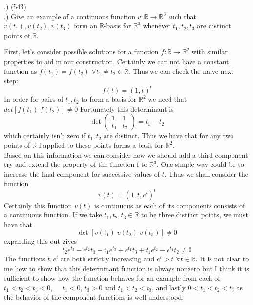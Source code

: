 \documentclass[a4paper, 11pt]{article}
\newcommand{\R}{\mathbb{R}}
\newenvironment{solution}{%
	\begin{list}{}{%
			\setlength{\topsep}{0pt}%
			\setlength{\leftmargin}{1.5cm}%
			\setlength{\rightmargin}{1.5cm}%
			\setlength{\listparindent}{\parindent}%
			\setlength{\itemindent}{\parindent}%
			\setlength{\parsep}{\parskip}%
		}%
		\item[]}{\end{list}}
\begin{document}
.) (543)\\

.) Give an example of a continuous function $v:\R\to\R^3$ such that $v(t_1), v(t_2), v(t_3)$ form an $\R$-basis for $\R^3$ whenever $t_1, t_2, t_3$ are distinct points of $\R$.\\

\begin{solution}
  \noindent First, let's consider possible solutions for a function $f:\R\to\R^2$ with similar properties to aid in our construction. Certainly we can not have a constant function as $f(t_1)=f(t_2)$ $\forall t_1\neq t_2 \in \R$. Thus we can check the naive next step:
  \begin{equation*}
    f(t) = (1, t)^t
  \end{equation*}
  In order for pairs of $t_1, t_2$ to form a basis for $\R^2$ we need that $det[f(t_1)\; f(t_2)]\neq 0$ Fortunately this determinant is
  \begin{equation*}
    \det\begin{pmatrix}1 & 1 \\ t_1 & t_2 \end{pmatrix} = t_1 - t_2
  \end{equation*}
  which certainly isn't zero if $t_1, t_2$ are distinct. Thus we have that for any two points of $\R$ f applied to these points forms a basis for $\R^2$. \\

  \noindent Based on this information we can consider how we should add a third component try and extend the property of the function f to $\R^3$. One simple way could be to increase the final component for successive values of $t$. Thus we shall consider the function
  \begin{equation*}
    v(t) = (1, t, e^t)^t
  \end{equation*}
  Certainly this function $v(t)$ is continuous as each of its components consists of a continuous function. If we take $t_1, t_2, t_3 \in \R$ to be three distinct points, we must have that
  \begin{equation*}
    \det[v(t_1)\; v(t_2)\; v(t_3)] \neq 0
  \end{equation*}
  expanding this out gives
  \begin{equation*}
    t_2 e^{t_3}-e^{t_2}t_3-t_1e^{t_3}+e^{t_1}t_3+t_1e^{t_2}-e^{t_1}t_2 \neq 0
  \end{equation*}
  The functions $t, e^t$ are both strictly increasing and $e^t > t$ $\forall t\in\R$. It is not clear to me how to show that this determinant function is always nonzero but I think it is sufficient to show how the function behaves for an example from each of $t_1<t_2<t_3<0$, $\;\;\;$   $t_1 < 0$, $t_3>0$ and $t_1<t_2<t_3$, and lastly $0<t_1<t_2<t_3$ as the behavior of the component functions is well understood. \\


\end{solution}
\end{document}
